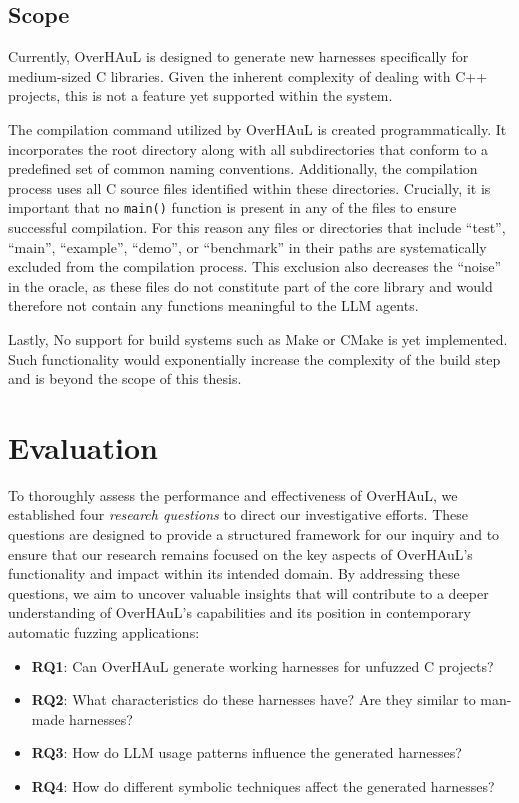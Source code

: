 \documentclass[
  a4paper,
]{scrreprt}
\theoremstyle{definition}
\theoremstyle{remark}
\begin{document}
\section{Scope}\label{sec-scope}

Currently, OverHAuL is designed to generate new harnesses specifically
for medium-sized C libraries. Given the inherent complexity of dealing
with C++ projects, this is not a feature yet supported within the
system.

The compilation command utilized by OverHAuL is created
programmatically. It incorporates the root directory along with all
subdirectories that conform to a predefined set of common naming
conventions. Additionally, the compilation process uses all C source
files identified within these directories. Crucially, it is important
that no \texttt{main()} function is present in any of the files to
ensure successful compilation. For this reason any files or directories
that include ``test'', ``main'', ``example'', ``demo'', or ``benchmark''
in their paths are systematically excluded from the compilation process.
This exclusion also decreases the ``noise'' in the oracle, as these
files do not constitute part of the core library and would therefore not
contain any functions meaningful to the LLM agents.

Lastly, No support for build systems such as Make or CMake
\autocite{cedilnik2000,feldman1979} is yet implemented. Such
functionality would exponentially increase the complexity of the build
step and is beyond the scope of this thesis.


\chapter{Evaluation}\label{sec-eval}

To thoroughly assess the performance and effectiveness of OverHAuL, we
established four \emph{research questions} to direct our investigative
efforts. These questions are designed to provide a structured framework
for our inquiry and to ensure that our research remains focused on the
key aspects of OverHAuL's functionality and impact within its intended
domain. By addressing these questions, we aim to uncover valuable
insights that will contribute to a deeper understanding of OverHAuL's
capabilities and its position in contemporary automatic fuzzing
applications:

\begin{itemize}
\item
  \textbf{RQ1}: Can OverHAuL generate working harnesses for unfuzzed C
  projects?
\item
  \textbf{RQ2}: What characteristics do these harnesses have? Are they
  similar to man-made harnesses?
\item
  \textbf{RQ3}: How do LLM usage patterns influence the generated
  harnesses?
\item
  \textbf{RQ4}: How do different symbolic techniques affect the
  generated harnesses?
\end{itemize}
\end{document}
